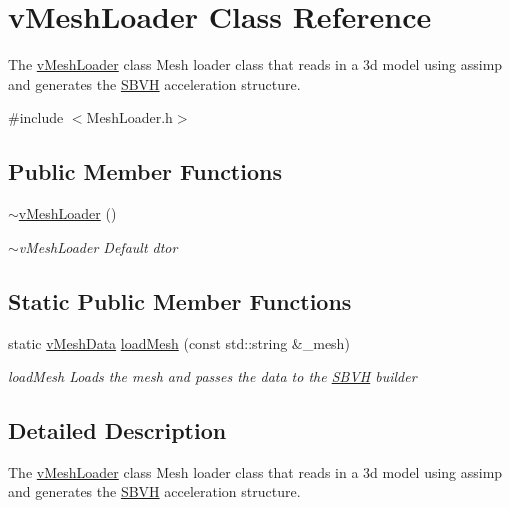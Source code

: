 \hypertarget{classvMeshLoader}{\section{v\-Mesh\-Loader Class Reference}
\label{classvMeshLoader}
}


The \hyperlink{classvMeshLoader}{v\-Mesh\-Loader} class Mesh loader class that reads in a 3d model using assimp and generates the \hyperlink{classSBVH}{S\-B\-V\-H} acceleration structure.  




{\ttfamily \#include $<$Mesh\-Loader.\-h$>$}

\subsection*{Public Member Functions}
\begin{DoxyCompactItemize}
\item 
\hypertarget{classvMeshLoader_ab54fba0ea56588e6b17f82a5c760c35e}{\hyperlink{classvMeshLoader_ab54fba0ea56588e6b17f82a5c760c35e}{$\sim$v\-Mesh\-Loader} ()}\label{classvMeshLoader_ab54fba0ea56588e6b17f82a5c760c35e}

\begin{DoxyCompactList}\small\item\em $\sim$v\-Mesh\-Loader Default dtor \end{DoxyCompactList}\end{DoxyCompactItemize}
\subsection*{Static Public Member Functions}
\begin{DoxyCompactItemize}
\item 
static \hyperlink{structvMeshData}{v\-Mesh\-Data} \hyperlink{classvMeshLoader_aec9bf22ad29c757c73f071f6b0455b25}{load\-Mesh} (const std\-::string \&\-\_\-mesh)
\begin{DoxyCompactList}\small\item\em load\-Mesh Loads the mesh and passes the data to the \hyperlink{classSBVH}{S\-B\-V\-H} builder \end{DoxyCompactList}\end{DoxyCompactItemize}


\subsection{Detailed Description}
The \hyperlink{classvMeshLoader}{v\-Mesh\-Loader} class Mesh loader class that reads in a 3d model using assimp and generates the \hyperlink{classSBVH}{S\-B\-V\-H} acceleration structure. 

